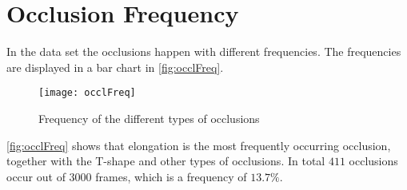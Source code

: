 \section{Occlusion Frequency}
In the data set the occlusions happen with different frequencies. The frequencies are displayed in a bar chart in \autoref{fig:occlFreq}.

\begin{figure}[H]
	\centering
	\texttt{[image: occlFreq]}
	\caption{Frequency of the different types of occlusions}
	\label{fig:occlFreq}
\end{figure}

\autoref{fig:occlFreq} shows that elongation is the most frequently occurring occlusion, together with the T-shape and other types of occlusions. In total $ 411 $ occlusions occur out of $ 3000 $ frames, which is a frequency of $13.7\%$.